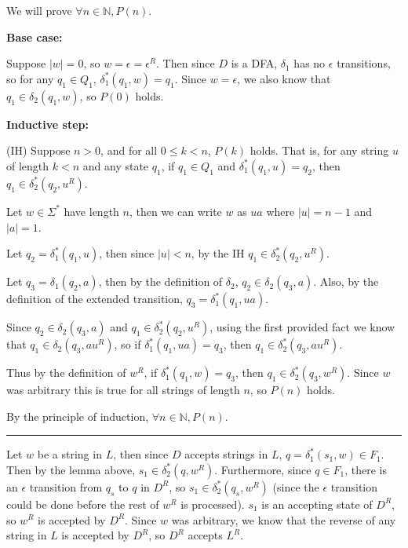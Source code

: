 \documentclass[12pt]{article}
\newcommand{\N}{\mathbb{N}}
\begin{document}
We will prove $\forall n \in \N, P(n)$.

\noindent \textbf{Base case:}

Suppose $|w| = 0$, so $w = \epsilon = \epsilon^R$. Then since $D$ is a DFA, $\delta_1$ has no $\epsilon$ transitions, so for any $q_1 \in Q_1$, $\delta_1^*(q_1, w) = q_1$. Since $w = \epsilon$, we also know that $q_1 \in \delta_2(q_1, w)$, so $P(0)$ holds.

\noindent \textbf{Inductive step:}

(IH) Suppose $n > 0$, and for all $0 \leq k < n$, $P(k)$ holds. That is, for any string $u$ of length $k < n$ and any state $q_1$, if $q_1 \in Q_1$ and $\delta_1^*(q_1, u) = q_2$, then $q_1 \in \delta_2^*(q_2, u^R)$.

Let $w \in \Sigma^*$ have length $n$, then we can write $w$ as $ua$ where $|u| = n - 1$ and $|a| = 1$.

Let $q_2 = \delta_1^*(q_1, u)$, then since $|u| < n$, by the IH $q_1 \in \delta_2^*(q_2, u^R)$.

Let $q_3 = \delta_1(q_2, a)$, then by the definition of $\delta_2$, $q_2 \in \delta_2(q_3, a)$. Also, by the definition of the extended transition, $q_3 = \delta_1^*(q_1, ua)$.

Since $q_2 \in \delta_2(q_3, a)$ and $q_1 \in \delta_2^*(q_2, u^R)$, using the first provided fact we know that $q_1 \in \delta_2(q_3, au^R)$, so if $\delta_1^*(q_1, ua) = q_3$, then $q_1 \in \delta_2^*(q_3, au^R)$.

Thus by the definition of $w^R$, if $\delta_1^*(q_1, w) = q_3$, then $q_1 \in \delta_2^*(q_3, w^R)$. Since $w$ was arbitrary this is true for all strings of length $n$, so $P(n)$ holds.

\hfill

\noindent By the principle of induction, $\forall n \in \N, P(n)$.

\hfill

\hrule

\hfill

Let $w$ be a string in $L$, then since $D$ accepts strings in $L$, $q = \delta_1^*(s_1, w) \in F_1$. Then by the lemma above, $s_1 \in \delta_2^*(q, w^R)$. Furthermore, since $q \in F_1$, there is an $\epsilon$ transition from $q_s$ to $q$ in $D^R$, so $s_1 \in \delta_2^*(q_s, w^R)$ (since the $\epsilon$ transition could be done before the rest of $w^R$ is processed). $s_1$ is an accepting state of $D^R$, so $w^R$ is accepted by $D^R$. Since $w$ was arbitrary, we know that the reverse of any string in $L$ is accepted by $D^R$, so $D^R$ accepts $L^R$.
\end{document}
